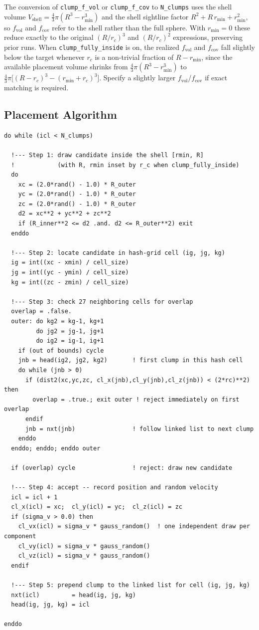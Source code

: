\documentclass[english,a4paper]{my_memo}
\begin{document}
The conversion of \texttt{clump\_f\_vol} or \texttt{clump\_f\_cov} to
\texttt{N\_clumps} uses the shell volume $V_\mathrm{shell} = \tfrac{4}{3}\pi
(R^3 - r_\mathrm{min}^3)$ and the shell sightline factor $R^2 + R\,
r_\mathrm{min} + r_\mathrm{min}^2$, so $f_\mathrm{vol}$ and $f_\mathrm{cov}$
refer to the shell rather than the full sphere.  With $r_\mathrm{min} = 0$
these reduce exactly to the original $(R/r_c)^3$ and $(R/r_c)^2$
expressions, preserving prior runs.  When \texttt{clump\_fully\_inside}
is on, the realized $f_\mathrm{vol}$ and $f_\mathrm{cov}$ fall slightly
below the target whenever $r_c$ is a non-trivial fraction of $R -
r_\mathrm{min}$, since the available placement volume shrinks from
$\tfrac{4}{3}\pi (R^3 - r_\mathrm{min}^3)$ to
$\tfrac{4}{3}\pi \bigl[(R-r_c)^3 - (r_\mathrm{min}+r_c)^3\bigr]$.
Specify a slightly larger $f_\mathrm{vol}$/$f_\mathrm{cov}$ if exact
matching is required.

\subsection{Placement Algorithm}

\begin{lstlisting}
do while (icl < N_clumps)

  !--- Step 1: draw candidate inside the shell [rmin, R]
  !            (with R, rmin inset by r_c when clump_fully_inside)
  do
    xc = (2.0*rand() - 1.0) * R_outer
    yc = (2.0*rand() - 1.0) * R_outer
    zc = (2.0*rand() - 1.0) * R_outer
    d2 = xc**2 + yc**2 + zc**2
    if (R_inner**2 <= d2 .and. d2 <= R_outer**2) exit
  enddo

  !--- Step 2: locate candidate in hash-grid cell (ig, jg, kg)
  ig = int((xc - xmin) / cell_size)
  jg = int((yc - ymin) / cell_size)
  kg = int((zc - zmin) / cell_size)

  !--- Step 3: check 27 neighboring cells for overlap
  overlap = .false.
  outer: do kg2 = kg-1, kg+1
         do jg2 = jg-1, jg+1
         do ig2 = ig-1, ig+1
    if (out of bounds) cycle
    jnb = head(ig2, jg2, kg2)       ! first clump in this hash cell
    do while (jnb > 0)
      if (dist2(xc,yc,zc, cl_x(jnb),cl_y(jnb),cl_z(jnb)) < (2*rc)**2) then
        overlap = .true.; exit outer ! reject immediately on first overlap
      endif
      jnb = nxt(jnb)                ! follow linked list to next clump
    enddo
  enddo; enddo; enddo outer

  if (overlap) cycle                ! reject: draw new candidate

  !--- Step 4: accept -- record position and random velocity
  icl = icl + 1
  cl_x(icl) = xc;  cl_y(icl) = yc;  cl_z(icl) = zc
  if (sigma_v > 0.0) then
    cl_vx(icl) = sigma_v * gauss_random()  ! one independent draw per component
    cl_vy(icl) = sigma_v * gauss_random()
    cl_vz(icl) = sigma_v * gauss_random()
  endif

  !--- Step 5: prepend clump to the linked list for cell (ig, jg, kg)
  nxt(icl)         = head(ig, jg, kg)
  head(ig, jg, kg) = icl

enddo
\end{lstlisting}
\end{document}
